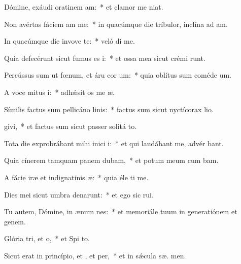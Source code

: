 \item Dómine, exáudi oratinem am:~* et clamor me   niat.
\item Non avértas fáciem am  me:~* in quacúmque die tríbulor, inclína ad   am.
\item In quacúmque die invove te:~* veló di me.
\item Quia defecérunt sicut fumus es i:~* et ossa mea sicut crémi runt.
\item Percússus sum ut fœnum, et áru cor um:~* quia oblítus sum coméde  um.
\item A voce mitus i:~* adhǽsit os me  æ.
\item Símilis factus sum pellicáno linis:~* factus sum sicut nyctícorax  lio.
\item {}givi,~* et factus sum sicut passer solitá  to.
\item Tota die exprobrábant mihi inici i:~* et qui laudábant me, advér  bant.
\item Quia cínerem tamquam panem dubam,~* et potum meum cum  bam.
\item A fácie iræ et indignatinis æ:~* quia éle ti me.
\item Dies mei sicut umbra denarunt:~* et ego sic  rui.
\item Tu autem, Dómine, in ænum nes:~* et memoriále tuum in generatiónem et genem.
\item Glória tri, et o,~* et Spi to.
\item Sicut erat in princípio, et , et per,~* et in sǽcula sæ. men.
